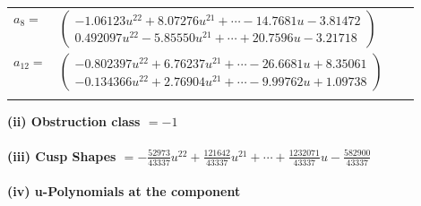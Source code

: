 \documentclass[1p]{elsarticle_modified}
\theoremstyle{definition}
\begin{document}
\begin{tabular}{m{7pt} m{180pt} m{7pt} m{180pt} }
\flushright $a_{8}=$&$\begin{pmatrix}-1.06123 u^{22}+8.07276 u^{21}+\cdots-14.7681 u-3.81472\\0.492097 u^{22}-5.85550 u^{21}+\cdots+20.7596 u-3.21718\end{pmatrix}$ \\
\flushright $a_{12}=$&$\begin{pmatrix}-0.802397 u^{22}+6.76237 u^{21}+\cdots-26.6681 u+8.35061\\-0.134366 u^{22}+2.76904 u^{21}+\cdots-9.99762 u+1.09738\end{pmatrix}$\\&\end{tabular}
\flushleft \textbf{(ii) Obstruction class $= -1$}\\~\\
\flushleft \textbf{(iii) Cusp Shapes $= -\frac{52973}{43337} u^{22}+\frac{121642}{43337} u^{21}+\cdots+\frac{1232071}{43337} u-\frac{582900}{43337}$}\\~\\
\newpage\renewcommand{\arraystretch}{1}
\flushleft \textbf{(iv) u-Polynomials at the component}\newline \\
\end{document}
